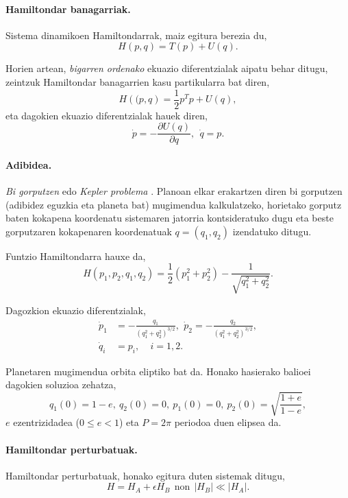 \paragraph*{Hamiltondar banagarriak.} Sistema dinamikoen Hamiltondarrak, maiz egitura berezia du,
\begin{equation*}
H({p},{q})=T(p)+U({q}).
\end{equation*} 

Horien artean, \emph{bigarren ordenako} ekuazio diferentzialak aipatu behar ditugu, zeintzuk Hamiltondar banagarrien kasu partikularra bat diren,  
\begin{equation*}
H(\mathbf(p,q)=\frac{1}{2}p^Tp +U(q),
\end{equation*}
eta dagokien ekuazio diferentzialak hauek diren,
\begin{equation}
\label{eq:biorden}
\dot{p}=-\frac{\partial U(q)}{\partial q}, \ \ \dot{q}=p. 
\end{equation}

\paragraph*{Adibidea.}
\emph{Bi gorputzen} edo \emph{Kepler problema} \cite{Hairer2006}. Planoan elkar erakartzen diren bi gorputzen (adibidez eguzkia eta planeta bat) mugimendua kalkulatzeko, horietako gorputz baten kokapena koordenatu sistemaren jatorria kontsideratuko dugu eta beste gorputzaren kokapenaren koordenatuak $q=(q_1,q_2)$ izendatuko ditugu. 

Funtzio Hamiltondarra hauxe da,
\begin{equation*}
H(p_1,p_2,q_1,q_2)=\frac{1}{2}(p_1^2+p_2^2)-\frac{1}{\sqrt{q_1^2+q_2^2}}.
\end{equation*}

Dagozkion ekuazio diferentzialak,
\begin{align*}
\dot{p}_1 &= -\frac{q_1}{(q_1^2+q_2^2)^{3/2}}, \ \, \dot{p}_2= -\frac{q_2}{(q_1^2+q_2^2)^{3/2}}, \\
\dot{q}_i &=p_i, \ \ \ \ \ i=1,2.
\end{align*}

Planetaren mugimendua orbita eliptiko bat da. Honako hasierako balioei dagokien soluzioa zehatza,
\begin{equation*}
q_1(0)=1-e, \ q_2(0)=0, \ p_1(0)=0, \ p_2(0)=\sqrt{ \frac{1+e}{1-e}}, 
\end{equation*}
$e$ ezentrizidadea ($0\le e < 1$)  eta $P=2\pi$ periodoa duen elipsea da. 

\paragraph*{Hamiltondar perturbatuak.} Hamiltondar perturbatuak, honako egitura duten sistemak ditugu,
\begin{equation*}
H=H_A+\epsilon H_B \ \  \text{non} \ \ |H_B|\ll |H_A|.
\end{equation*}


